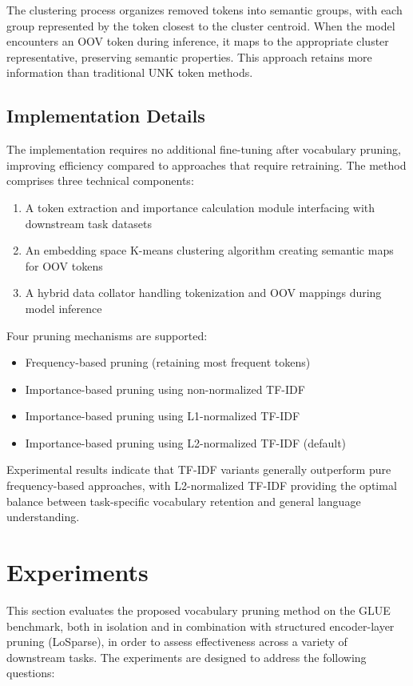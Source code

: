 \documentclass[twocolumn]{article}
\begin{document}
The clustering process organizes removed tokens into semantic groups, with each group represented by the token closest to the cluster centroid. When the model encounters an OOV token during inference, it maps to the appropriate cluster representative, preserving semantic properties. This approach retains more information than traditional UNK token methods.

\subsection{Implementation Details}
The implementation requires no additional fine-tuning after vocabulary pruning, improving efficiency compared to approaches that require retraining. The method comprises three technical components:

\begin{enumerate}
    \item A token extraction and importance calculation module interfacing with downstream task datasets
    \item An embedding space K-means clustering algorithm creating semantic maps for OOV tokens
    \item A hybrid data collator handling tokenization and OOV mappings during model inference
\end{enumerate}

Four pruning mechanisms are supported:
\begin{itemize}
    \item Frequency-based pruning (retaining most frequent tokens)
    \item Importance-based pruning using non-normalized TF-IDF
    \item Importance-based pruning using L1-normalized TF-IDF 
    \item Importance-based pruning using L2-normalized TF-IDF (default)
\end{itemize}

Experimental results indicate that TF-IDF variants generally outperform pure frequency-based approaches, with L2-normalized TF-IDF providing the optimal balance between task-specific vocabulary retention and general language understanding.


\newpage
\section{Experiments}
This section evaluates the proposed vocabulary pruning method on the GLUE benchmark, both in isolation and in combination with structured encoder-layer pruning (LoSparse), in order to assess effectiveness across a variety of downstream tasks. The experiments are designed to address the following questions:
\end{document}
